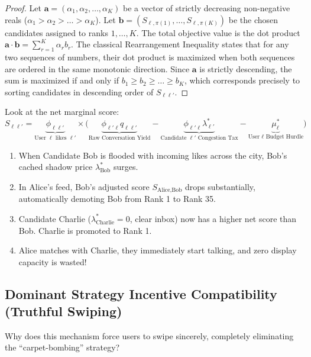 \documentclass[11pt,letterpaper]{article}
\theoremstyle{definition}
\theoremstyle{plain}
\theoremstyle{remark}
\begin{document}
\begin{proof}
Let $\mathbf{a} = (\alpha_1, \alpha_2, \dots, \alpha_K)$ be a vector of strictly decreasing non-negative reals ($\alpha_1 > \alpha_2 > \dots > \alpha_K$). Let $\mathbf{b} = (S_{\ell, \pi(1)}, \dots, S_{\ell, \pi(K)})$ be the chosen candidates assigned to ranks $1, \dots, K$.
The total objective value is the dot product $\mathbf{a} \cdot \mathbf{b} = \sum_{r=1}^K \alpha_r b_r$.
The classical Rearrangement Inequality states that for any two sequences of numbers, their dot product is maximized when both sequences are ordered in the same monotonic direction. Since $\mathbf{a}$ is strictly descending, the sum is maximized if and only if $b_1 \ge b_2 \ge \dots \ge b_K$, which corresponds precisely to sorting candidates in descending order of $S_{\ell\ell'}$.
\end{proof}

\begin{ideabox}
Look at the net marginal score:
\[
    S_{\ell\ell'} = \underbrace{\phi_{\ell\ell'}}_{\text{User } \ell \text{ likes } \ell'} \times \Big( \underbrace{\phi_{\ell'\ell} q_{\ell\ell'}}_{\text{Raw Conversation Yield}} - \underbrace{\phi_{\ell'\ell} \lambda_{\ell'}^*}_{\text{Candidate } \ell' \text{ Congestion Tax}} - \underbrace{\mu_\ell^*}_{\text{User } \ell \text{ Budget Hurdle}} \Big)
\]
\begin{enumerate}[leftmargin=1.5em]
    \item When Candidate Bob is flooded with incoming likes across the city, Bob's cached shadow price $\lambda_{\text{Bob}}^*$ surges.
    \item In Alice's feed, Bob's adjusted score $S_{\text{Alice}, \text{Bob}}$ drops substantially, automatically demoting Bob from Rank 1 to Rank 35.
    \item Candidate Charlie ($\lambda_{\text{Charlie}}^* = 0$, clear inbox) now has a higher net score than Bob. Charlie is promoted to Rank 1.
    \item Alice matches with Charlie, they immediately start talking, and zero display capacity is wasted!
\end{enumerate}
\end{ideabox}

\subsection{Dominant Strategy Incentive Compatibility (Truthful Swiping)}
Why does this mechanism force users to swipe sincerely, completely eliminating the ``carpet-bombing'' strategy?
\end{document}
